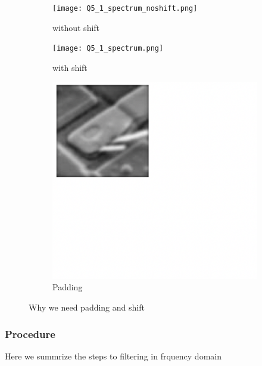 \documentclass[
	12pt, %
]{style/fphw}
\begin{document}
\begin{figure}[H]
     \centering
     \begin{subfigure}[b]{0.3\textwidth}
         \centering
         \texttt{[image: Q5\_1\_spectrum\_noshift.png]}
         \caption{without shift}
         \label{Q5_2_lowpass_30_error.tif}
     \end{subfigure}
     \hfill
     \begin{subfigure}[b]{0.3\textwidth}
         \centering
         \texttt{[image: Q5\_1\_spectrum.png]}
         \caption{with shift}
         \label{Q5_2_lowpass_30_error.tif}
     \end{subfigure}
     \hfill
     \begin{subfigure}[b]{0.3\textwidth}
         \centering
         \includegraphics[width=\textwidth]{chart/padding.png}
         \caption{Padding}
         \label{padding.png}
     \end{subfigure}
        \caption{Why we need padding and shift}
        \label{padding}
\end{figure}

\subsubsection*{Procedure}
Here we summrize the steps to filtering in frquency domain
\end{document}
